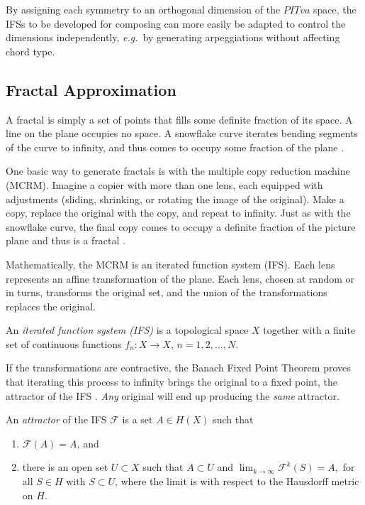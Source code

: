 \documentclass[english,11pt,letterpaper,onecolumn]{scrartcl}
\numberwithin{equation}{section}
\newcommand{\cF}{\mathcal{F}}
\begin{document}
By assigning each symmetry to an orthogonal dimension of the $PITva$ space, the 
IFSs to be developed for composing can more easily be adapted to control the 
dimensions independently, \textit{e.g.}\ by generating arpeggiations without 
affecting chord type.

\subsection{Fractal Approximation}

A fractal is simply a set of points that fills some definite fraction of its 
space. A line on the plane occupies no space. A snowflake curve iterates 
bending segments of the curve to infinity, and thus comes to occupy some 
fraction of the plane \cite{Mandelbrot:1982:FGN}.

One basic way to generate fractals is with the multiple copy reduction 
machine (MCRM). Imagine a copier with more than one lens, each equipped with 
adjustments (sliding, shrinking, or rotating the image of the original). Make 
a copy, replace the original with the copy, and repeat to infinity. Just as 
with the snowflake curve, the final copy comes to occupy a definite fraction 
of the picture plane and thus is a fractal \cite{chaosandfractals}. 

Mathematically, the MCRM is an iterated function system (IFS). Each lens 
represents an affine transformation of the plane. Each lens, chosen at random 
or in turns, transforms the original set, and the union of the transformations  
replaces the original.

An \emph{iterated function system (IFS)} is a topological space $X$
together with a finite set of continuous functions $f_{n}:X\rightarrow X$, 
$n=1,2,\dots,N$.

If the transformations are contractive, the Banach Fixed Point Theorem proves 
that iterating this process to infinity brings the original to a fixed point, 
the attractor of the IFS \cite{chaosandfractals, barnsley1985iterated, 
10.2307/24893080, fractalseverywhere}. \textit{Any} original will end up 
producing the \textit{same} attractor. 

An \emph{attractor} of the IFS $\mathcal{F}$ is a set
$A\in H(X)$ such that

\begin{enumerate}
\item $\cF(A)=A$, and

\item there is an open set $U\subset X$ such that $A\subset U$ and
$\lim_{k\rightarrow\infty}\cF^{k}(S)=A,$ for all $S\in H$ with $S\subset U$,
where the limit is with respect to the Hausdorff metric on $H$.
\end{enumerate}
\end{document}
